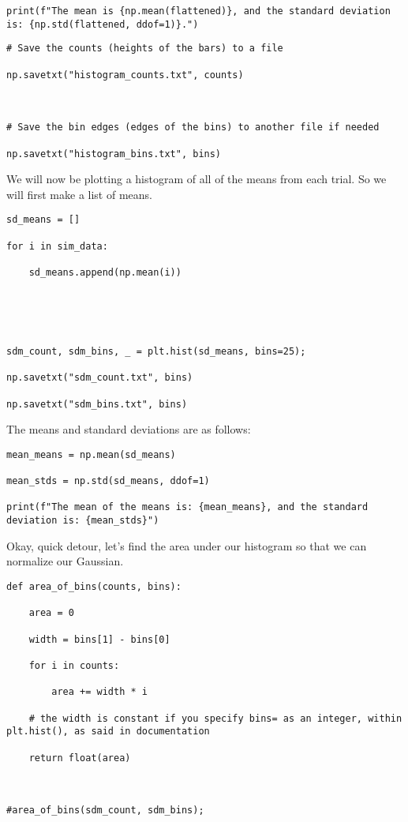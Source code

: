 \documentclass[12pt]{article}
\begin{document}
\begin{lstlisting}[frame=shadowbox]
print(f"The mean is {np.mean(flattened)}, and the standard deviation is: {np.std(flattened, ddof=1)}.")
\end{lstlisting}


\begin{lstlisting}[frame=shadowbox]
# Save the counts (heights of the bars) to a file

np.savetxt("histogram_counts.txt", counts)



# Save the bin edges (edges of the bins) to another file if needed

np.savetxt("histogram_bins.txt", bins)
\end{lstlisting}


We will now be plotting a histogram of all of the means from each trial. So we will first make a list of means.


\begin{lstlisting}[frame=shadowbox]
sd_means = []

for i in sim_data:

    sd_means.append(np.mean(i))





sdm_count, sdm_bins, _ = plt.hist(sd_means, bins=25);

np.savetxt("sdm_count.txt", bins)

np.savetxt("sdm_bins.txt", bins)
\end{lstlisting}


The means and standard deviations are as follows:


\begin{lstlisting}[frame=shadowbox]
mean_means = np.mean(sd_means)

mean_stds = np.std(sd_means, ddof=1)

print(f"The mean of the means is: {mean_means}, and the standard deviation is: {mean_stds}")
\end{lstlisting}


Okay, quick detour, let's find the area under our histogram so that we can normalize our Gaussian.


\begin{lstlisting}[frame=shadowbox]
def area_of_bins(counts, bins):

    area = 0

    width = bins[1] - bins[0]

    for i in counts:

        area += width * i

    # the width is constant if you specify bins= as an integer, within plt.hist(), as said in documentation

    return float(area)

    

#area_of_bins(sdm_count, sdm_bins);
\end{lstlisting}
\end{document}
